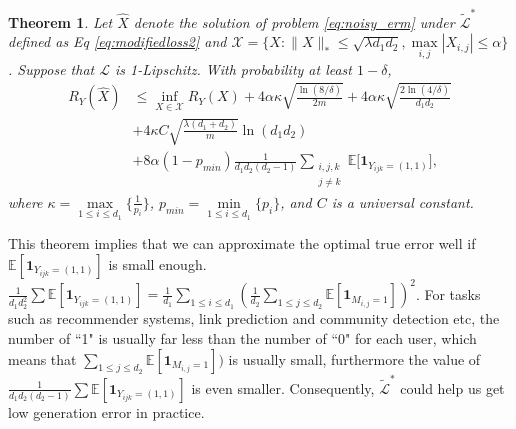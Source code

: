 \documentclass{article}
\numberwithin{equation}{section}
\newcommand{\E}{\mathbb{E}}
\newtheorem{theorem}{Theorem}
\newtheorem{sampling strategy}{Sampling Strategy}
\begin{document}
\begin{theorem}
Let $\hat{X}$ denote the solution of problem \ref{eq:noisy_erm} under $\tilde{\mathcal{L}}^*$ defined as Eq \ref{eq:modifiedloss2} and $\mathcal{X} = \{X: \|X\|_* \leq \sqrt{\lambda d_1 d_2}, \underset{i,j}{\max} |X_{i,j}| \leq \alpha \}$. Suppose that $\mathcal{L}$ is 1-Lipschitz.  With probability at least $1 - \delta$,
\begin{equation}
\begin{aligned}
 R_Y(\hat{X}) & \leq  \underset{X\in \mathcal{X}}{\inf} R_Y(X) + 4 \alpha \kappa \sqrt{\frac{\ln(8/\delta)}{2m}} + 4\alpha \kappa \sqrt{ \frac{2\ln(4/\delta) }{d_1 d_2} } \\
        & + 4 \kappa C \sqrt{\frac{\lambda (d_1 + d_2)}{m}} \ln(d_1 d_2) \\
        & +  8\alpha(1 - p_{min})  \frac{1}{d_1 d_2 (d_2 - 1)} \sum_{ \substack{i,j,k\\ j \neq k}} \E\Big[ \bm{1}_{Y_{ijk} = (1,1)} \Big],
\end{aligned}
\end{equation} 
where $\kappa = \underset{1 \leq i \leq d_1}{\max}\{\frac{1}{p_i}\}$, $p_{min} = \underset{1 \leq i \leq d_1}{\min}\{p_i\}$, and $C$ is a universal constant.
\label{thm:truerisk2}
\end{theorem}

This theorem implies that we can approximate the optimal true error well if $\mathbb{E}[\bm{1}_{Y_{ijk} = (1,1)}]$ is small enough. $\frac{1}{d_1d_2^2} \sum \mathbb{E}[ \bm{1}_{Y_{ijk} = (1,1)} ] = \frac{1}{d_1} \underset{1 \leq i \leq d_1}{\sum} (\frac{1}{d_2} \underset{1 \leq j \leq d_2}{\sum} \mathbb{E}[\bm{1}_{M_{i,j} = 1}] )^2$. For tasks such as recommender systems, link prediction and community detection etc, the number of ``1" is usually far less than the number of ``0" for each user, which means that $\underset{1 \leq j \leq d_2}{\sum} \mathbb{E}[\bm{1}_{M_{i,j} = 1}] )$ is usually small, furthermore the value of $\frac{1}{d_1d_2(d_2-1)} \sum \mathbb{E}[ \bm{1}_{Y_{ijk} = (1,1)} ]$ is even smaller. Consequently, $\tilde{\mathcal{L}}^*$ could help us get low generation error in practice.
\end{document}
